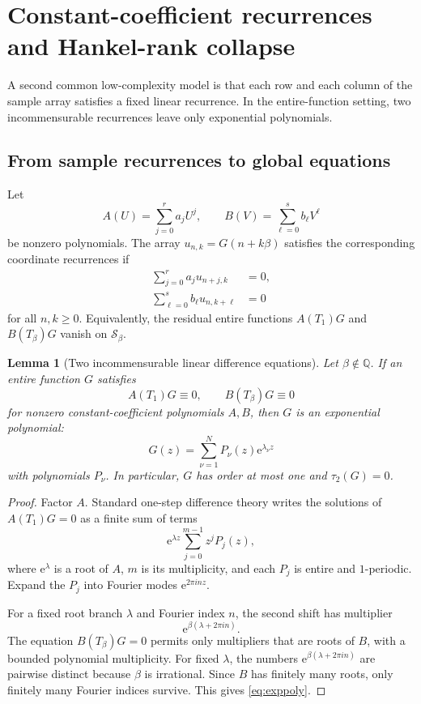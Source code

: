 \documentclass[11pt,oneside]{article}
\newtheorem{lemma}[theorem]{Lemma}
\theoremstyle{definition}
\theoremstyle{remark}
\newcommand{\Q}{\mathbb Q}
\newcommand{\Sbeta}{\mathcal S_\beta}
\newcommand{\ee}{\mathrm e}
\newcommand{\Tsh}[1]{T_{#1}}
\begin{document}
\section{Constant-coefficient recurrences and Hankel-rank collapse}
\label{sec:recurrence}

A second common low-complexity model is that each row and each column of the sample array
satisfies a fixed linear recurrence.  In the entire-function setting, two incommensurable
recurrences leave only exponential polynomials.

\subsection{From sample recurrences to global equations}

Let
\[
 A(U)=\sum_{j=0}^{r}a_jU^j,
 \qquad
 B(V)=\sum_{\ell=0}^{s}b_\ell V^\ell
\]
be nonzero polynomials.  The array $u_{n,k}=G(n+k\beta)$ satisfies the corresponding
coordinate recurrences if
\begin{align}
 \sum_{j=0}^{r}a_j u_{n+j,k}&=0,
 \label{eq:nrec}\\
 \sum_{\ell=0}^{s}b_\ell u_{n,k+\ell}&=0
 \label{eq:krec}
\end{align}
for all $n,k\ge0$.  Equivalently, the residual entire functions
$A(\Tsh{1})G$ and $B(\Tsh{\beta})G$ vanish on $\Sbeta$.

\begin{lemma}[Two incommensurable linear difference equations]
\label{lem:twoCfinite}
Let $\beta\notin\Q$.  If an entire function $G$ satisfies
\[
 A(\Tsh{1})G\equiv0,
 \qquad
 B(\Tsh{\beta})G\equiv0
\]
for nonzero constant-coefficient polynomials $A,B$, then $G$ is an exponential polynomial:
\begin{equation}
 G(z)=\sum_{\nu=1}^{N}P_\nu(z)\ee^{\lambda_\nu z}
 \label{eq:exppoly}
\end{equation}
with polynomials $P_\nu$.  In particular, $G$ has order at most one and
$\tau_2(G)=0$.
\end{lemma}

\begin{proof}
Factor $A$.  Standard one-step difference theory writes the solutions of
$A(\Tsh{1})G=0$ as a finite sum of terms
\[
 \ee^{\lambda z}\sum_{j=0}^{m-1}z^jP_j(z),
\]
where $\ee^\lambda$ is a root of $A$, $m$ is its multiplicity, and each $P_j$ is entire and
$1$-periodic.  Expand the $P_j$ into Fourier modes $\ee^{2\pi i n z}$.

For a fixed root branch $\lambda$ and Fourier index $n$, the second shift has multiplier
\[
 \ee^{\beta(\lambda+2\pi i n)}.
\]
The equation $B(\Tsh{\beta})G=0$ permits only multipliers that are roots of $B$, with a
bounded polynomial multiplicity.  For fixed $\lambda$, the numbers
$\ee^{\beta(\lambda+2\pi i n)}$ are pairwise distinct because $\beta$ is irrational.
Since $B$ has finitely many roots, only finitely many Fourier indices survive.  This gives
\eqref{eq:exppoly}.
\end{proof}
\end{document}
